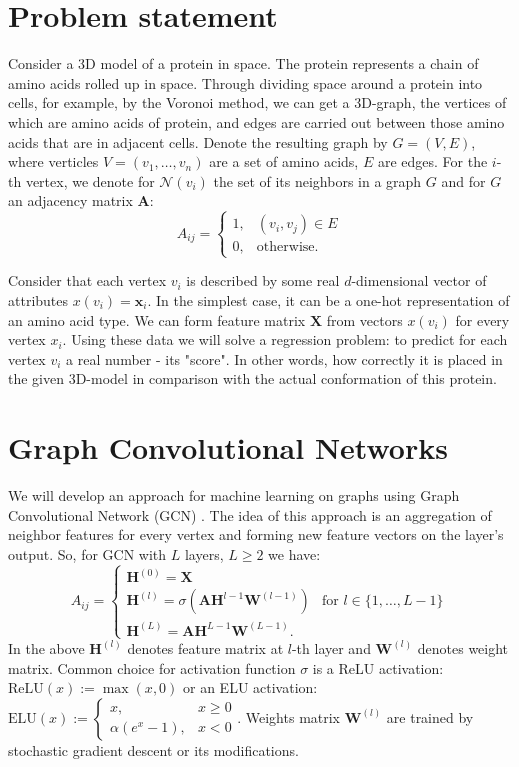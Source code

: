 \documentclass[12pt,twoside]{article}
\begin{document}
	\section{Problem statement}
	Consider a 3D model of a protein in space. The protein represents a chain of amino acids rolled up in space. 
	Through dividing space around a protein into cells, for example, by the Voronoi method, we can get a
	3D-graph, the vertices of which are amino acids of protein, and edges are carried out between those amino
	acids that are in adjacent cells. Denote the resulting graph by $G = (V, E)$, where verticles $V = (v_1, \ldots, v_n)$
	are a set of amino acids, $E$ are edges. For the $i$-th vertex, we denote for $\mathcal{N}(v_i)$ the
	set of its neighbors in a graph $G$ and for $G$ an adjacency matrix $\boldsymbol{A}$:
	$$A_{ij} = \begin{cases}
		1, & (v_i, v_j) \in E \\
		0, & \text{otherwise}.
	\end{cases}$$ 

	Consider that each vertex $v_i$ is described by some real $d$-dimensional vector of attributes 
	$x(v_i) = \boldsymbol{x}_i$. In the simplest case, it can be a one-hot representation of an amino acid type.
	We can form feature matrix $\boldsymbol{X}$ from vectors $x(v_i)$ for every vertex $x_i$.
	Using these data we will solve a regression problem: to predict for each vertex $v_i$ a real number - its
	"score". In other words, how correctly it is placed in the given 3D-model in comparison with the 
	actual conformation of this protein.

	\section{Graph Convolutional Networks}
	We will develop an approach for machine learning on graphs using Graph Convolutional Network (GCN) \cite{Kipf2016}.
	The idea of this approach is an aggregation of neighbor features for every vertex and forming new feature vectors on the
	layer's output. So, for GCN with $L$ layers, $L \geqslant 2$ we have:
	$$A_{ij} = \begin{cases}
		\boldsymbol{H}^{(0)} = \boldsymbol{X} \\
		\boldsymbol{H}^{(l)} = \sigma\left(\boldsymbol{A} \boldsymbol{H}^{l-1}\boldsymbol{W}^{(l-1)}\right) & \text{for } l \in \{1, \ldots, L - 1\} \\
		\boldsymbol{H}^{(L)} =  \boldsymbol{A} \boldsymbol{H}^{L-1}\boldsymbol{W}^{(L-1)}.
	\end{cases}$$
	In the above $\boldsymbol{H}^{(l)}$ denotes feature matrix at $l$-th layer and $\boldsymbol{W}^{(l)}$ denotes weight matrix. Common choice for activation
	function $\sigma$ is a ReLU activation: $\text{ReLU}(x) := \max(x, 0)$ or an ELU activation: $\text{ELU}(x) := \begin{cases}
		x, & x \geqslant 0 \\
		\alpha(e^x - 1), & x < 0
	\end{cases}$.
	Weights matrix $\boldsymbol{W}^{(l)}$ are trained by stochastic gradient descent or its modifications.
\end{document}
